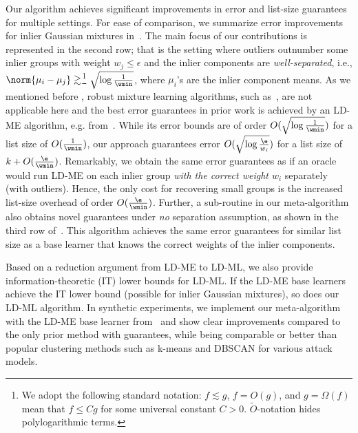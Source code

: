 Our algorithm achieves significant improvements in error and list-size guarantees for multiple settings. For ease of comparison, we summarize error improvements for inlier Gaussian mixtures in~. 
The main focus of our contributions is represented in the second row; that is the  setting where outliers outnumber some inlier groups with weight $w_j \leq \epsilon$
and the inlier components are \emph{well-separated}, i.e., \(\norm{\mu_i - \mu_j} \gtrsim\)\footnote{ We adopt the following standard notation: \(f \lesssim g\), \(f = O(g)\), and \(g = \Omega(f)\) mean that \(f \leq Cg\) for some universal constant \(C > 0\). \(\widetilde O\)-notation hides polylogarithmic terms.} \(\sqrt{\log \frac{1}{\wmin}}\), where \(\mu_i\)'s are the inlier component means.
As we mentioned before , robust mixture learning algorithms, such as~\cite{bakshi2022robustly, ivkov2022list}, are not applicable here and the best error guarantees in prior work is achieved by an LD-ME algorithm, e.g. from~\cite{diakonikolas2018list}. While its error bounds are of order \(O(\sqrt{\log \frac{1}{\wmin}})\) for a list size of \(O(\frac{1}{\wmin})\), 
our approach guarantees error \(O(\sqrt{\log \frac{\e}{w_i}})\)
for a list size of \(k + O(\frac{\e}{\wmin})\).
Remarkably, we obtain the same error guarantees as if an oracle would run LD-ME on each inlier group \emph{with the correct weight \(w_i\)} separately (with outliers).
Hence, the only cost for recovering small groups is the increased list-size overhead of order \(O(\frac{\e}{\wmin})\).
Further, a sub-routine in our meta-algorithm also obtains novel guarantees under \emph{no} separation assumption,
as shown in the third row of~.
This algorithm achieves the same error guarantees for similar list size as a base learner that knows 
the correct weights of the inlier components.

Based on a reduction argument from LD-ME to LD-ML, we also provide information-theoretic (IT) lower bounds for LD-ML. If the LD-ME base learners achieve the IT lower bound (possible for inlier Gaussian mixtures), so does our LD-ML algorithm. 
In synthetic experiments, we implement our meta-algorithm with the LD-ME base learner from~\cite{diakonikolas2022clustering} and show clear improvements compared to the only prior method with guarantees, while being comparable or better than popular clustering methods such as k-means and DBSCAN for various attack models.


